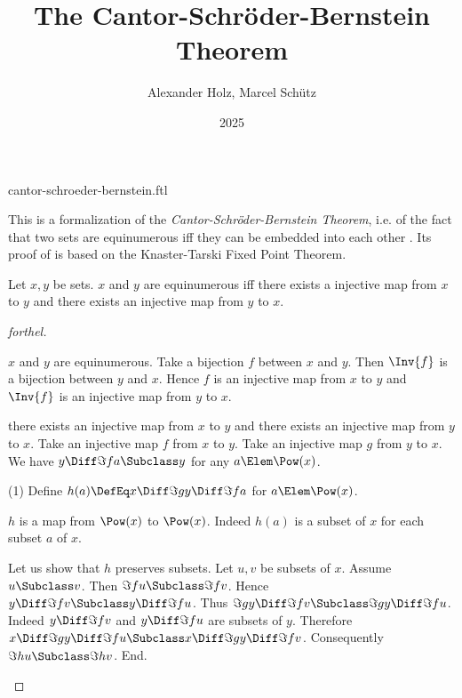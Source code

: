 \documentclass{stex}
\title{The Cantor-Schröder-Bernstein Theorem}
\author{Alexander Holz, Marcel Schütz}
\date{2025}
\begin{document}
\begin{smodule}{cantor-schroeder-bernstein.ftl}



\maketitle

\noindent This is a formalization of the \textit{Cantor-Schröder-Bernstein
Theorem}, i.e. of the fact that two sets are equinumerous iff they can be
embedded into each other \cite{Schroeder2012}.
Its proof of is based on the Knaster-Tarski Fixed Point Theorem.

\begin{theorem}[forthel,title=Cantor-Schröder-Bernstein,name=Cantor-Schroeder-Bernstein]
  Let $x,y$ be sets.
  $x$ and $y$ are equinumerous iff there exists a injective map from $x$ to $y$ and there exists an injective map from $y$ to $x$.
\end{theorem}
\begin{proof}[forthel]
  \begin{case}{$x$ and $y$ are equinumerous.}
    Take a bijection $f$ between $x$ and $y$.
    Then $\Inv{f}$ is a bijection between $y$ and $x$.
    Hence $f$ is an injective map from $x$ to $y$ and $\Inv{f}$ is an
    injective map from $y$ to $x$.
  \end{case}

  \begin{case}{there exists an injective map from $x$ to $y$ and there exists an injective map from $y$ to $x$.}
    Take an injective map $f$ from $x$ to $y$.
    Take an injective map $g$ from $y$ to $x$.
    We have $y \Diff \Im{f}{a} \Subclass y$ for any $a \Elem \Pow(x)$.

    (1) Define $h(a) \DefEq x \Diff \Im{g}{y \Diff \Im{f}{a}}$ for $a \Elem \Pow(x)$.

    $h$ is a map from $\Pow(x)$ to $\Pow(x)$.
    Indeed $h(a)$ is a subset of $x$ for each subset $a$ of $x$.

    Let us show that $h$ preserves subsets.
      Let $u, v$ be subsets of $x$.
      Assume $u \Subclass v$.
      Then $\Im{f}{u} \Subclass \Im{f}{v}$.
      Hence $y \Diff \Im{f}{v} \Subclass y \Diff \Im{f}{u}$.
      Thus $\Im{g}{y \Diff \Im{f}{v}} \Subclass\linebreak \Im{g}{y \Diff \Im{f}{u}}$.
      Indeed $y \Diff \Im{f}{v}$ and $y \Diff \Im{f}{u}$ are subsets of $y$.
      Therefore\linebreak $x \Diff \Im{g}{y \Diff \Im{f}{u}} \Subclass x \Diff \Im{g}{y \Diff \Im{f}{v}}$.
      Consequently $\Im{h}{u} \Subclass \Im{h}{v}$.
    End.


\end{case}
\end{proof}
\end{smodule}
\end{document}
